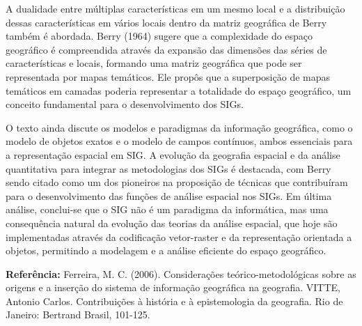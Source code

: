 \documentclass[
]{article}
\begin{document}
A dualidade entre múltiplas características em um mesmo local e a
distribuição dessas características em vários locais dentro da matriz
geográfica de Berry também é abordada. Berry (1964) sugere que a
complexidade do espaço geográfico é compreendida através da expansão das
dimensões das séries de características e locais, formando uma matriz
geográfica que pode ser representada por mapas temáticos. Ele propôs que
a superposição de mapas temáticos em camadas poderia representar a
totalidade do espaço geográfico, um conceito fundamental para o
desenvolvimento dos SIGs.

O texto ainda discute os modelos e paradigmas da informação geográfica,
como o modelo de objetos exatos e o modelo de campos contínuos, ambos
essenciais para a representação espacial em SIG. A evolução da geografia
espacial e da análise quantitativa para integrar as metodologias dos
SIGs é destacada, com Berry sendo citado como um dos pioneiros na
proposição de técnicas que contribuíram para o desenvolvimento das
funções de análise espacial nos SIGs. Em última análise, conclui-se que
o SIG não é um paradigma da informática, mas uma consequência natural da
evolução das teorias da análise espacial, que hoje são implementadas
através da codificação vetor-raster e da representação orientada a
objetos, permitindo a modelagem e a análise eficiente do espaço
geográfico.

\textbf{Referência:} Ferreira, M. C. (2006). Considerações
teórico-metodológicas sobre as origens e a inserção do sistema de
informação geográfica na geografia. VITTE, Antonio Carlos. Contribuições
à história e à epistemologia da geografia. Rio de Janeiro: Bertrand
Brasil, 101-125.
\end{document}
